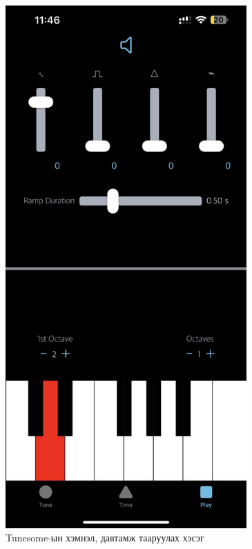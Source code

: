 \begin{figure}[h]
	\centering
	\includegraphics[height=20cm]{images/tunersome3.jpg}
	\caption{Tunesome-ын хэмнэл, давтамж тааруулах хэсэг}
	\label{fig:modalform}
\end{figure}
\clearpage
